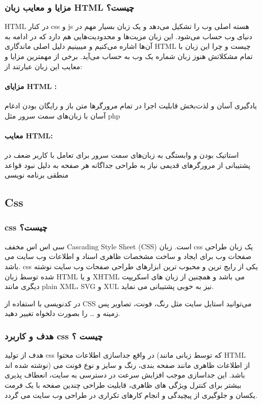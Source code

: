 \subsubsection{مزایا و معایب زبان HTML چیست؟}
HTML در کنار css و js هسته اصلی وب را تشکیل می‌دهد و یک زبان بسیار مهم در دنیای وب حساب می‌شود. این زبان مزیت‌ها و محدودیت‌هایی هم دارد که در ادامه به آن‌ها اشاره می‌کنیم و میبینیم دلیل اصلی ماندگاری HTML چیست و چرا این زبان با تمام مشکلاتش هنوز زبان شماره یک وب به حساب می‌آید. برخی از مهمترین مزایا و معایب این زبان عبارتند از:

\paragraph{مزایای HTML :}
یادگیری آسان و لذت‌بخش
قابلیت اجرا در تمام مرورگرها
متن باز و رایگان بودن
ادغام آسان با زبان‌های سمت سرور مثل 
php

\paragraph{معایب HTML:}
استاتیک بودن و وابستگی به زبان‌های سمت سرور برای تعامل با کاربر
ضعف در پشتیبانی از مرورگرهای قدیمی
نیاز به طراحی جداگانه هر صفحه به دلیل نبود قواعد منطقی برنامه نویسی


\subsection{Css}
\subsubsection{css چیست؟}
سی اس اس مخفف Cascading Style Sheet (CSS) است. زبان css یک زبان طراحی صفحات وب برای ایجاد و ساخت مشخصات ظاهری اسناد و اطلاعات وب سایت می باشد. css یکی از رایج ترین و محبوب ترین ابزارهای طراحی صفحات وب سایت نوشته شده توسط زبان HTML و یا XHTML می باشد و همچنین از زبان های اسکریپت دیگری مانند plain XML، SVG و XUL نیز به خوبی پشتیبانی می نماید.

در کدنویسی با استفاده از CSS می‌توانید استایل سایت مثل رنگ، فونت، تصاویر پس زمینه و … را بصورت دلخواه تغییر دهید.

\subsubsection{هدف و کاربرد css چیست ؟}
هدف از تولید css در واقع جداسازی اطلاعات محتوا (که توسط زبانی مانند HTML نوشته شده اند) از اطلاعات ظاهری مانند صفحه بندی، رنگ و سایز و نوع فونت می باشد. این جداسازی موجب افزایش سرعت در دسترسی به سایت، انعطاف پذیری بیشتر برای کنترل ویژگی های ظاهری، قابلیت طراحی چندین صفحه با یک فرمت یکسان و جلوگیری از پیچیدگی و انجام کارهای تکراری در طراحی وب سایت می گردد.

